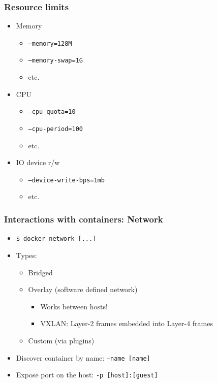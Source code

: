 \documentclass[xetex,mathserif,serif]{beamer}
\begin{document}
  \begin{frame}
    \frametitle{Resource limits}
    \begin{itemize}
      \item Memory
        \begin{itemize}
          \item \texttt{--memory=128M}
          \item \texttt{--memory-swap=1G}
          \item etc.
        \end{itemize}
      \item CPU
        \begin{itemize}
          \item \texttt{--cpu-quota=10}
          \item \texttt{--cpu-period=100}
          \item etc.
        \end{itemize}
      \item IO device r/w
        \begin{itemize}
          \item \texttt{--device-write-bps=1mb}
          \item etc.
        \end{itemize}
    \end{itemize}
  \end{frame}
  \begin{frame}
    \frametitle{Interactions with containers: Network}
    \begin{itemize}
      \item \texttt{\$ docker network [...]}
      \item Types:
        \begin{itemize}
          \item Bridged
          \item Overlay (software defined network)
            \begin{itemize}
              \item Works between hosts!
              \item VXLAN: Layer-2 frames embedded into Layer-4 frames
            \end{itemize}
          \item Custom (via plugins)
        \end{itemize}
      \item Discover container by name: \texttt{--name [name]}
      \item Expose port on the host: \texttt{-p [host]:[guest]}
    \end{itemize}
  \end{frame}
\end{document}
